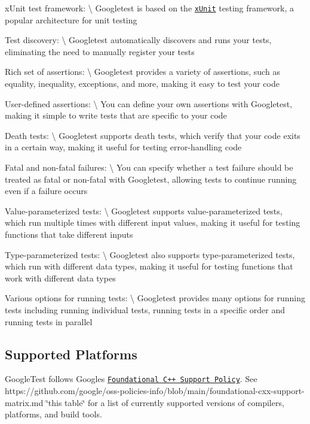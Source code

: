 \begin{DoxyItemize}
\item x\+Unit test framework\+: \textbackslash{} Googletest is based on the \href{https://en.wikipedia.org/wiki/XUnit}{\tt x\+Unit} testing framework, a popular architecture for unit testing
\item Test discovery\+: \textbackslash{} Googletest automatically discovers and runs your tests, eliminating the need to manually register your tests
\item Rich set of assertions\+: \textbackslash{} Googletest provides a variety of assertions, such as equality, inequality, exceptions, and more, making it easy to test your code
\item User-\/defined assertions\+: \textbackslash{} You can define your own assertions with Googletest, making it simple to write tests that are specific to your code
\item Death tests\+: \textbackslash{} Googletest supports death tests, which verify that your code exits in a certain way, making it useful for testing error-\/handling code
\item Fatal and non-\/fatal failures\+: \textbackslash{} You can specify whether a test failure should be treated as fatal or non-\/fatal with Googletest, allowing tests to continue running even if a failure occurs
\item Value-\/parameterized tests\+: \textbackslash{} Googletest supports value-\/parameterized tests, which run multiple times with different input values, making it useful for testing functions that take different inputs
\item Type-\/parameterized tests\+: \textbackslash{} Googletest also supports type-\/parameterized tests, which run with different data types, making it useful for testing functions that work with different data types
\item Various options for running tests\+: \textbackslash{} Googletest provides many options for running tests including running individual tests, running tests in a specific order and running tests in parallel
\end{DoxyItemize}

\subsection*{Supported Platforms}

Google\+Test follows Google\textquotesingle{}s \href{https://opensource.google/documentation/policies/cplusplus-support}{\tt Foundational C++ Support Policy}. See https\+://github.com/google/oss-\/policies-\/info/blob/main/foundational-\/cxx-\/support-\/matrix.\+md \char`\"{}this table\char`\"{} for a list of currently supported versions of compilers, platforms, and build tools.

